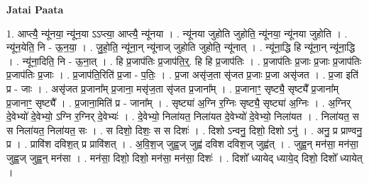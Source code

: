 \documentclass[17pt]{extarticle}
\begin{document}
\textbf{Jatai Paata} \newline

1. आप्त्यै॒ न्यू॑नया॒ न्यू॑न॒या ऽऽप्त्या॒ आप्त्यै॒ न्यू॑नया । . न्यू॑नया जुहोति जुहोति॒ न्यू॑नया॒ न्यू॑नया जुहोति । . न्यू॑न॒येति॒ नि - ऊ॒न॒या॒ । . जु॒हो॒ति॒ न्यू॑ना॒न् न्यू॑नाज् जुहोति जुहोति॒ न्यू॑नात् । . न्यू॑ना॒द्धि हि न्यू॑ना॒न् न्यू॑ना॒द्धि । . न्यू॑ना॒दिति॒ नि - ऊ॒ना॒त् । . हि प्र॒जाप॑तिः प्र॒जाप॑ति॒र्॒. हि हि प्र॒जाप॑तिः । . प्र॒जाप॑तिः प्र॒जाः प्र॒जाः प्र॒जाप॑तिः प्र॒जाप॑तिः प्र॒जाः । . प्र॒जाप॑ति॒रिति॑ प्र॒जा - प॒तिः॒ । . प्र॒जा असृ॑ज॒ता सृ॑जत प्र॒जाः प्र॒जा असृ॑जत । . प्र॒जा इति॑ प्र - जाः । . असृ॑जत प्र॒जाना᳚म् प्र॒जाना॒ मसृ॑ज॒ता सृ॑जत प्र॒जाना᳚म् । . प्र॒जानाꣳ॒॒ सृष्ट्यै॒ सृष्ट्यै᳚ प्र॒जाना᳚म् प्र॒जानाꣳ॒॒ सृष्ट्यै᳚ । . प्र॒जाना॒मिति॑ प्र - जाना᳚म् । . सृष्ट्या॑ अ॒ग्नि र॒ग्निः सृष्ट्यै॒ सृष्ट्या॑ अ॒ग्निः । . अ॒ग्निर् दे॒वेभ्यो॑ दे॒वेभ्यो॒ ऽग्नि र॒ग्निर् दे॒वेभ्यः॑ । . दे॒वेभ्यो॒ निला॑यत॒ निला॑यत दे॒वेभ्यो॑ दे॒वेभ्यो॒ निला॑यत । . निला॑यत॒ स स निला॑यत॒ निला॑यत॒ सः । . स दिशो॒ दिशः॒ स स दिशः॑ । . दिशो ऽन्वनु॒ दिशो॒ दिशो ऽनु॑ । . अनु॒ प्र प्राण्वनु॒ प्र । . प्रावि॑श दविश॒त् प्र प्रावि॑शत् । . अ॒वि॒श॒ज् जुह्व॒ज् जुह्व॑ दविश दविश॒ज् जुह्व॑त् । . जुह्व॒न् मन॑सा॒ मन॑सा॒ जुह्व॒ज् जुह्व॒न् मन॑सा । . मन॑सा॒ दिशो॒ दिशो॒ मन॑सा॒ मन॑सा॒ दिशः॑ । . दिशो᳚ ध्यायेद् ध्याये॒द् दिशो॒ दिशो᳚ ध्यायेत् । \newline
\end{document}
